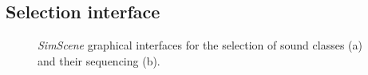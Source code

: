 \documentclass[12pt]{elsarticle}
\newcommand{\myfloatalign}{\centering}
\begin{document}
\subsection{Selection interface}
\label{sec:simscene_ssf}

\begin{figure}[!tp]
		\myfloatalign
         \par
       \caption{\emph{SimScene} graphical interfaces for the selection of sound classes (a) and their sequencing (b).}
\end{figure}

\end{document}
